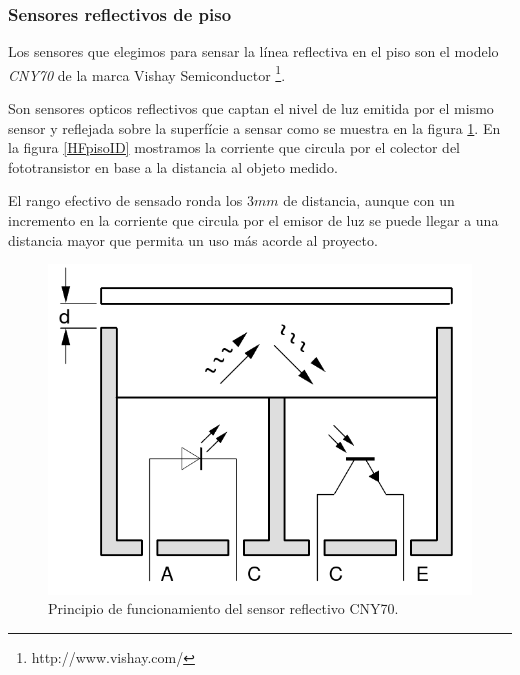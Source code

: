 \subsubsection{Sensores reflectivos de piso}
\label{Hpiso}

	Los sensores que elegimos para sensar la l\'inea reflectiva en el piso son el modelo \emph{CNY70} de la marca Vishay Semiconductor
	\footnote{http://www.vishay.com/}.
	
	Son sensores opticos reflectivos que captan el nivel de luz emitida por el mismo sensor y reflejada sobre la superf\'icie a sensar
	como se muestra en la figura \ref{HFpiso}. En la figura \ref{HFpisoID} mostramos la corriente que circula por el colector del
	fototransistor en base a la distancia al objeto medido.
	
	El rango efectivo de sensado ronda los $3 mm$ de distancia, aunque con un incremento en la corriente que circula por el emisor de luz
	se puede llegar a una distancia mayor que permita un uso m\'as acorde al proyecto.
	
	\begin{figure}[ht]
		\centering
		\includegraphics[scale=0.15]{piso.png}
		\caption{Principio de funcionamiento del sensor reflectivo CNY70.}
		\label{HFpiso}
	\end{figure}
	
